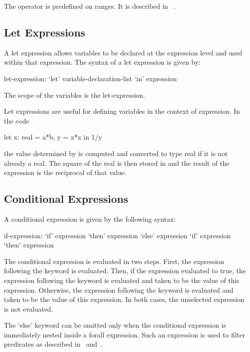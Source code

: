 The operator \chpl{#} is predefined on ranges. It is described
in ~.

\subsection{Let Expressions}
\label{Let_Expressions}

A let expression allows variables to be declared at the expression
level and used within that expression.  The syntax of a let expression
is given by:
\begin{syntax}
let-expression:
  `let' variable-declaration-list `in' expression
\end{syntax}
The scope of the variables is the let-expression.
\begin{example}
Let expressions are useful for defining variables in the context of
expression.  In the code
\begin{chapel}
  let x: real = a*b, y = x*x in 1/y
\end{chapel}
the value determined by  is computed and converted to type
real if it is not already a real.  The square of the real is then
stored in  and the result of the expression is the reciprocal
of that value.
\end{example}

\subsection{Conditional Expressions}
\label{Conditional_Expressions}

A conditional expression is given by the following syntax:
\begin{syntax}
if-expression:
  `if' expression `then' expression `else' expression
  `if' expression `then' expression
\end{syntax}
The conditional expression is evaluated in two steps.  First, the
expression following the  keyword is evaluated.  Then, if the
expression evaluated to true, the expression following the 
keyword is evaluated and taken to be the value of this expression.
Otherwise, the expression following the  keyword is
evaluated and taken to be the value of this expression.  In both
cases, the unselected expression is not evaluated.

The `else' keyword can be omitted only when the conditional expression
is immediately nested inside a forall expression.  Such an expression
is used to filter predicates as described
in~ and~.

